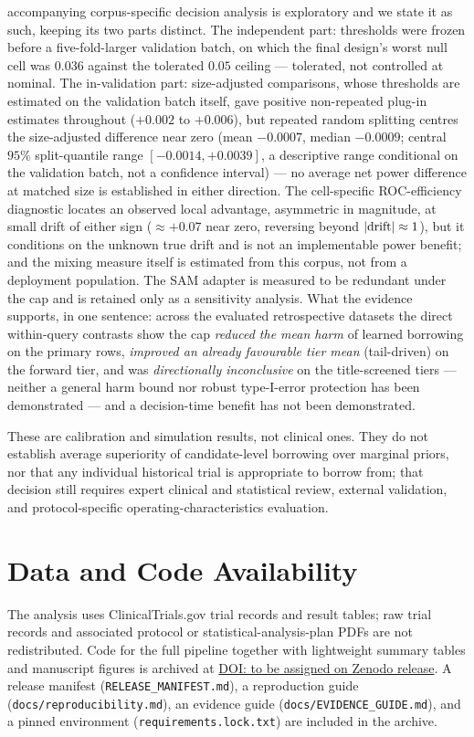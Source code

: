 \documentclass[11pt]{article}
\begin{document}
accompanying corpus-specific decision analysis is exploratory and we state
it as such, keeping its two parts distinct. The independent part:
thresholds were frozen before a five-fold-larger validation batch, on
which the final design's worst null cell was $0.036$ against the
tolerated $0.05$ ceiling --- tolerated, not controlled at nominal. The
in-validation part: size-adjusted comparisons, whose thresholds are
estimated on the validation batch itself, gave positive non-repeated
plug-in estimates
throughout ($+0.002$ to $+0.006$), but repeated random splitting centres
the size-adjusted difference near zero (mean $-0.0007$, median
$-0.0009$; central $95\%$ split-quantile range
$[-0.0014, +0.0039]$, a descriptive range conditional on the validation
batch, not a confidence interval) --- no average net power difference at matched
size is established in either direction. The cell-specific
ROC-efficiency diagnostic locates an observed local advantage, asymmetric
in magnitude, at small
drift of either sign ($\approx +0.07$ near zero, reversing beyond
$|{\rm drift}| \approx 1$), but it conditions on the unknown true drift
and is not an implementable power benefit; and the mixing measure itself
is estimated from this corpus, not from a
deployment population. The SAM adapter is
measured to be redundant under the cap and is retained only as a
sensitivity analysis. What the evidence supports, in one sentence: across
the evaluated retrospective datasets the direct within-query contrasts
show the cap \emph{reduced the mean harm} of learned borrowing on the
primary rows, \emph{improved an already favourable tier mean}
(tail-driven) on
the forward tier, and was \emph{directionally inconclusive} on the
title-screened tiers --- neither a
general harm bound nor robust type-I-error protection has been
demonstrated --- and a decision-time benefit has not been demonstrated.

These are calibration and simulation results, not clinical ones. They do not
establish average superiority of candidate-level borrowing over marginal
priors, nor that any individual historical trial is appropriate to borrow
from; that decision still requires expert clinical and statistical review,
external validation, and protocol-specific operating-characteristics
evaluation.

\section*{Data and Code Availability}
{\sloppy
The analysis uses ClinicalTrials.gov trial records and result tables; raw trial
records and associated protocol or statistical-analysis-plan PDFs are not
redistributed. Code for the full pipeline together with lightweight summary
tables and manuscript figures is archived at
\href{https://doi.org/}{DOI: to be assigned on Zenodo release}. A release
manifest (\texttt{RELEASE\_MANIFEST.md}), a reproduction guide
(\texttt{docs/rep\-ro\-du\-ci\-bi\-li\-ty.md}), an evidence guide
(\texttt{docs/EVIDENCE\_GUIDE.md}), and a pinned environment
(\texttt{requirements.lock.txt}) are included in the archive.
\par}
\end{document}
